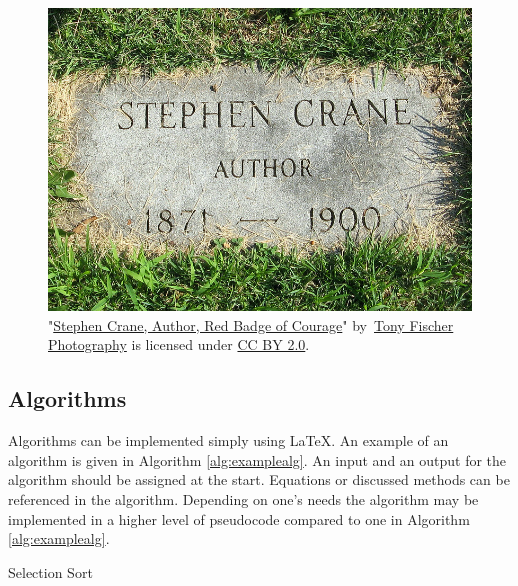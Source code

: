 \begin{figure}[H]
  \begin{center}
    \includegraphics[width=12cm]{Figures/ccby.jpg}
  \end{center}
  \caption{"\href{https://openverse.org/image/110032f8-1a7a-421f-86b1-88fdfde2e44f
    }{Stephen Crane, Author, Red Badge of Courage}"
    by~\href{https://www.flickr.com/photos/tonythemisfit/}{Tony Fischer
    Photography} is licensed under
  \href{https://creativecommons.org/licenses/by/2.0/}{CC BY 2.0}.}
  \label{fig:ccbypic}
\end{figure}

\subsection{Algorithms}
Algorithms can be implemented simply using \LaTeX. An example of an
algorithm is given in Algorithm \ref{alg:examplealg}. An input and an
output for the algorithm should be assigned at the start. Equations
or discussed methods can be referenced in the algorithm. Depending on
one's needs the algorithm may be implemented in a higher level of
pseudocode compared to one in Algorithm \ref{alg:examplealg}.

\vspace{7mm}
\begin{algorithm}[H]
  \SetAlgoLined
  \DontPrintSemicolon
  \caption{Selection Sort}
  \label{alg:examplealg}
\end{algorithm}

